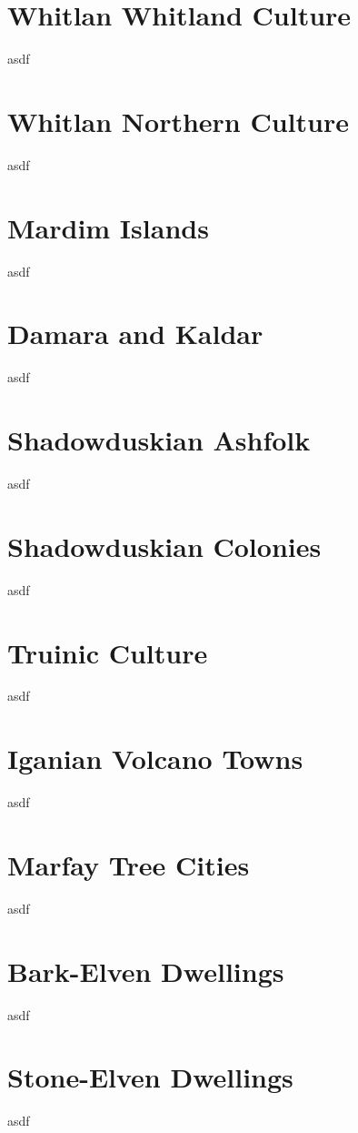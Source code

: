 \section{Whitlan Whitland Culture}
asdf

\section{Whitlan Northern Culture}
asdf

\section{Mardim Islands}
asdf

\section{Damara and Kaldar}
asdf

\section{Shadowduskian Ashfolk}
asdf

\section{Shadowduskian Colonies}
asdf

\section{Truinic Culture} %
asdf

\section{Iganian Volcano Towns}
asdf

\section{Marfay Tree Cities}
asdf

\section{Bark-Elven Dwellings}
asdf

\section{Stone-Elven Dwellings}
asdf

